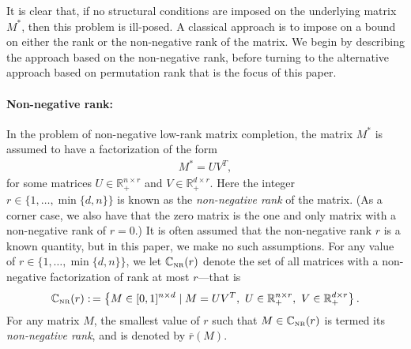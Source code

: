 \documentclass[11pt, hidelinks]{article} %
\newcommand{\defn}{\ensuremath{:\,=}}
\newcommand{\reals}{\ensuremath{\mathbb{R}}}
\newcommand{\numrows}{n}
\newcommand{\numcols}{d}
\newcommand{\wtmatrix}{M}
\newcommand{\wt}{\wtmatrix}
\newcommand{\wtstar}{\wtmatrix^*}
\newcommand{\matrixset}{\mathbb{C}}
\newcommand{\nnset}{\matrixset_{\mbox{\tiny NR}}}
\newcommand{\nnrank}{r}
\newcommand{\lowLeft}{U}
\newcommand{\lowRight}{V}
\newcommand{\fnnnrank}[1]{\overline{\nnrank}(#1)}
\begin{document}
It is clear that, if no structural conditions are imposed on the
underlying matrix $\wtstar$, then this problem is ill-posed.  A
classical approach is to impose on a bound on either the rank or the
non-negative rank of the matrix.  We begin by describing the approach
based on the non-negative rank, before turning to the alternative
approach based on permutation rank that is the focus of this paper.

\paragraph*{Non-negative rank:} In the problem of non-negative
low-rank matrix completion, the matrix $\wtstar$ is assumed to have a
factorization of the form
\begin{align*}
\wtstar = \lowLeft \lowRight^T,
\end{align*}
for some matrices $\lowLeft \in \reals_+^{\numrows \times \nnrank}$
and $\lowRight \in \reals_+^{\numcols \times \nnrank}$. Here the
integer $\nnrank \in \{1,\ldots, \min\{\numcols, \numrows\}\}$ is
known as the \emph{non-negative rank} of the matrix. (As a corner
case, we also have that the zero matrix is the one and only matrix
with a non-negative rank of $\nnrank = 0$.)  It is often assumed that
the non-negative rank $\nnrank$ is a known quantity, but in this
paper, we make no such assumptions. For any value of $\nnrank \in
\{1,\ldots,\min\{\numcols, \numrows\}\}$, we let $\nnset(\nnrank)$
denote the set of all matrices with a non-negative factorization of
rank at most $\nnrank$---that is
\begin{align*}
\nnset(\nnrank) \defn \left \{ \wtmatrix \in [0,1]^{\numrows \times \numcols} \mid \wtmatrix = \lowLeft \lowRight^T,~ \lowLeft \in \reals_+^{\numrows \times \nnrank},~ \lowRight \in \reals_+^{\numcols \times \nnrank} \right \}.
\end{align*}
For any matrix $\wtmatrix$, the smallest value of $\nnrank$ such that $\wtmatrix \in \nnset(\nnrank)$ is termed its \emph{non-negative rank},
and is denoted by $\fnnnrank{\wt}$.
\end{document}
